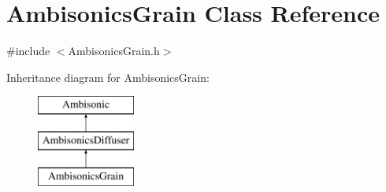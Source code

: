 \hypertarget{class_ambisonics_grain}{\section{Ambisonics\-Grain Class Reference}
\label{class_ambisonics_grain}
}


{\ttfamily \#include $<$Ambisonics\-Grain.\-h$>$}

Inheritance diagram for Ambisonics\-Grain\-:\begin{figure}[H]
\begin{center}
\leavevmode
\includegraphics[height=3.000000cm]{class_ambisonics_grain}
\end{center}
\end{figure}
